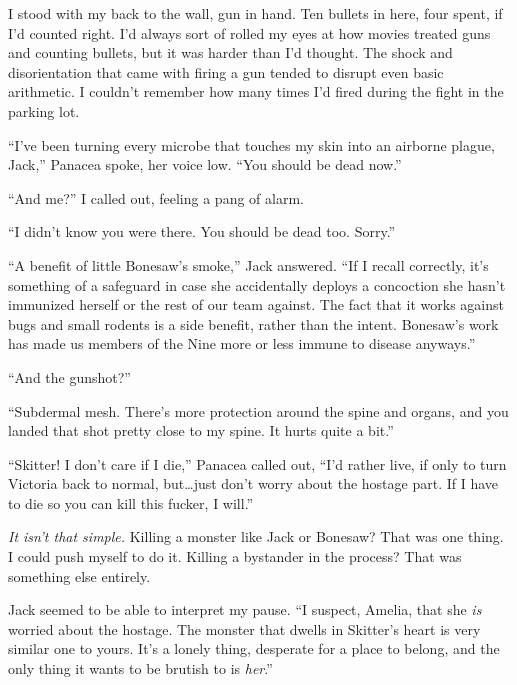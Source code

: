 I stood with my back to the wall, gun in hand.  Ten bullets in here, four spent, if I'd counted right.  I'd always sort of rolled my eyes at how movies treated guns and counting bullets, but it was harder than I'd thought.  The shock and disorientation that came with firing a gun tended to disrupt even basic arithmetic.  I couldn't remember how many times I'd fired during the fight in the parking lot.



``I've been turning every microbe that touches my skin into an airborne plague, Jack,'' Panacea spoke, her voice low.  ``You should be dead now.''



``And me?'' I called out, feeling a pang of alarm.



``I didn't know you were there.  You should be dead too.  Sorry.''



``A benefit of little Bonesaw's smoke,'' Jack answered.  ``If I recall correctly, it's something of a safeguard in case she accidentally deploys a concoction she hasn't immunized herself or the rest of our team against.  The fact that it works against bugs and small rodents is a side benefit, rather than the intent.  Bonesaw's work has made us members of the Nine more or less immune to disease anyways.''



``And the gunshot?''



``Subdermal mesh.  There's more protection around the spine and organs, and you landed that shot pretty close to my spine.  It hurts quite a bit.''



``Skitter!  I don't care if I die,'' Panacea called out, ``I'd rather live, if only to turn Victoria back to normal, but\ldots just don't worry about the hostage part.  If I have to die so you can kill this fucker, I will.''



\emph{It isn't that simple.}  Killing a monster like Jack or Bonesaw?  That was one thing.  I could push myself to do it.  Killing a bystander in the process?  That was something else entirely.



Jack seemed to be able to interpret my pause.  ``I suspect, Amelia, that she \emph{is} worried about the hostage.  The monster that dwells in Skitter's heart is very similar one to yours.  It's a lonely thing, desperate for a place to belong, and the only thing it wants to be brutish to is \emph{her}.''



